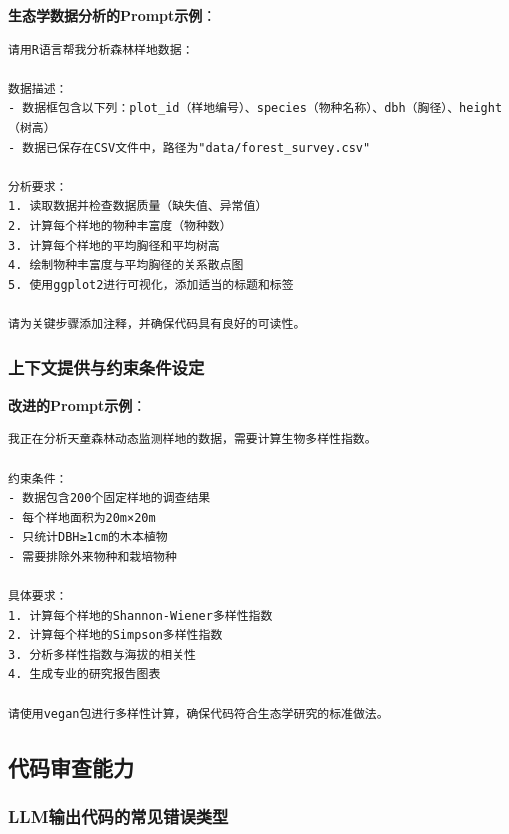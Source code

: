 \documentclass[
]{book}
\begin{document}
\textbf{生态学数据分析的Prompt示例}：

\begin{verbatim}
请用R语言帮我分析森林样地数据：

数据描述：
- 数据框包含以下列：plot_id（样地编号）、species（物种名称）、dbh（胸径）、height（树高）
- 数据已保存在CSV文件中，路径为"data/forest_survey.csv"

分析要求：
1. 读取数据并检查数据质量（缺失值、异常值）
2. 计算每个样地的物种丰富度（物种数）
3. 计算每个样地的平均胸径和平均树高
4. 绘制物种丰富度与平均胸径的关系散点图
5. 使用ggplot2进行可视化，添加适当的标题和标签

请为关键步骤添加注释，并确保代码具有良好的可读性。
\end{verbatim}

\hypertarget{ux4e0aux4e0bux6587ux63d0ux4f9bux4e0eux7ea6ux675fux6761ux4ef6ux8bbeux5b9a}{%
\subsubsection{上下文提供与约束条件设定}\label{ux4e0aux4e0bux6587ux63d0ux4f9bux4e0eux7ea6ux675fux6761ux4ef6ux8bbeux5b9a}}

\textbf{改进的Prompt示例}：

\begin{verbatim}
我正在分析天童森林动态监测样地的数据，需要计算生物多样性指数。

约束条件：
- 数据包含200个固定样地的调查结果
- 每个样地面积为20m×20m
- 只统计DBH≥1cm的木本植物
- 需要排除外来物种和栽培物种

具体要求：
1. 计算每个样地的Shannon-Wiener多样性指数
2. 计算每个样地的Simpson多样性指数
3. 分析多样性指数与海拔的相关性
4. 生成专业的研究报告图表

请使用vegan包进行多样性计算，确保代码符合生态学研究的标准做法。
\end{verbatim}

\hypertarget{ux4ee3ux7801ux5ba1ux67e5ux80fdux529b}{%
\subsection{代码审查能力}\label{ux4ee3ux7801ux5ba1ux67e5ux80fdux529b}}

\hypertarget{llmux8f93ux51faux4ee3ux7801ux7684ux5e38ux89c1ux9519ux8befux7c7bux578b}{%
\subsubsection{LLM输出代码的常见错误类型}\label{llmux8f93ux51faux4ee3ux7801ux7684ux5e38ux89c1ux9519ux8befux7c7bux578b}}
\end{document}

